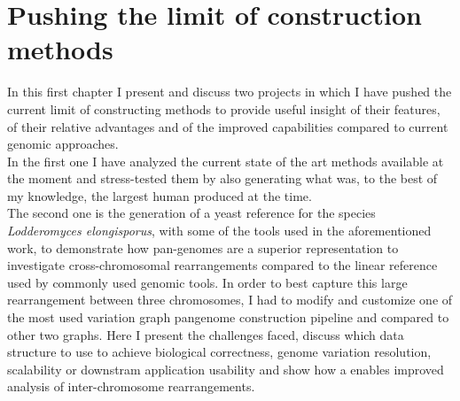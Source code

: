 
\chapter{Pushing the limit of \pangenome construction methods}
\label{sec:pushing}
In this first chapter I present and discuss two projects in which I have pushed the current limit of \pangenome constructing methods to provide useful insight of their features, of their relative advantages and of the improved capabilities compared to current genomic approaches.\\ In the first one I have analyzed the current state of the art methods available at the moment and stress-tested them by also generating what was, to the best of my knowledge, the largest human \pangenome produced at the time. \\ The second one is the generation of a yeast \pangenome reference for the species \emph{Lodderomyces elongisporus}, with some of the tools used in the aforementioned work, to demonstrate how pan-genomes are a superior representation to investigate cross-chromosomal rearrangements compared to the linear reference used by commonly used genomic tools. In order to best capture this large rearrangement between three chromosomes, I had to modify and customize one of the most used variation graph pangenome construction pipeline and compared to other two graphs. Here I present the challenges faced, discuss which data structure to use to achieve biological correctness, genome variation resolution, scalability or downstram application usability and show how a \pangenome enables improved analysis of inter-chromosome rearrangements.

